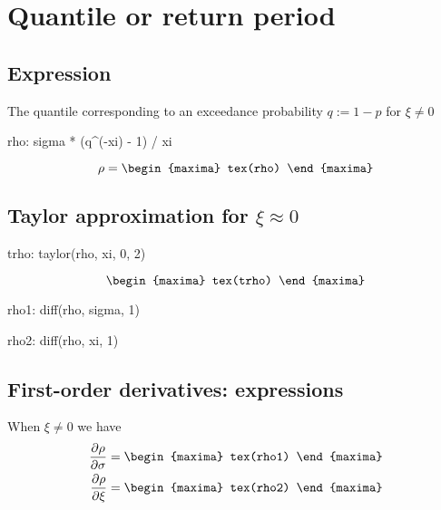 \section{Quantile or return period}
\subsection{Expression}
The quantile corresponding to an exceedance probability $q := 1 -p$ for $\xi \neq 0$
\begin{maxima}
  rho: sigma * (q^(-xi) - 1) / xi
\end{maxima}
\[
\rho=
\begin{maxima}
 tex(rho)
\end{maxima}
\]


\subsection{Taylor approximation for $\xi \approx 0$}
\begin{maxima}
 trho: taylor(rho, xi, 0, 2)
\end{maxima}

{\color{MonVertF}
  \begin{equation}
    \label{eq:Trho}
    \begin{maxima}
      tex(trho)
    \end{maxima}
  \end{equation}
}

\begin{maxima}
  rho1: diff(rho, sigma, 1)
\end{maxima}
\begin{maxima}
  rho2: diff(rho, xi, 1)
\end{maxima}


\subsection{First-order derivatives: expressions}
When $\xi \neq 0$ we have
\begin{align*}
\frac{\partial \rho}{\partial \sigma}  &=
\begin{maxima}
 tex(rho1)
\end{maxima}
\\
\frac{\partial \rho}{\partial \xi} &=
\begin{maxima}
 tex(rho2)
\end{maxima}
\end{align*}


